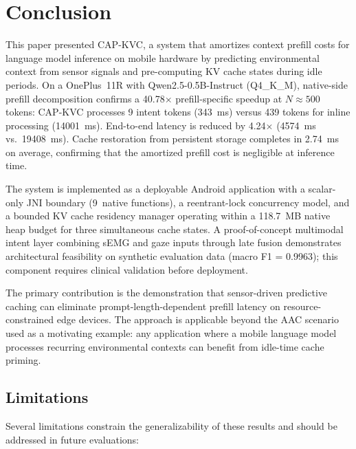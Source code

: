 \documentclass[journal]{IEEEtran}
\begin{document}
\section{Conclusion}
\label{sec:conclusion}

This paper presented CAP-KVC, a system that amortizes context prefill costs for language model inference on mobile hardware by predicting environmental context from sensor signals and pre-computing KV cache states during idle periods. On a OnePlus~11R with Qwen2.5-0.5B-Instruct (Q4\_K\_M), native-side prefill decomposition confirms a 40.78$\times$ prefill-specific speedup at $N \approx 500$ tokens: CAP-KVC processes 9 intent tokens (343~ms) versus 439 tokens for inline processing (14001~ms). End-to-end latency is reduced by 4.24$\times$ (4574~ms vs.\ 19408~ms). Cache restoration from persistent storage completes in 2.74~ms on average, confirming that the amortized prefill cost is negligible at inference time.

The system is implemented as a deployable Android application with a scalar-only JNI boundary (9~native functions), a reentrant-lock concurrency model, and a bounded KV cache residency manager operating within a 118.7~MB native heap budget for three simultaneous cache states. A proof-of-concept multimodal intent layer combining sEMG and gaze inputs through late fusion demonstrates architectural feasibility on synthetic evaluation data (macro F1 = 0.9963); this component requires clinical validation before deployment.

The primary contribution is the demonstration that sensor-driven predictive caching can eliminate prompt-length-dependent prefill latency on resource-constrained edge devices. The approach is applicable beyond the AAC scenario used as a motivating example: any application where a mobile language model processes recurring environmental contexts can benefit from idle-time cache priming.

\subsection{Limitations}

Several limitations constrain the generalizability of these results and should be addressed in future evaluations:
\end{document}
